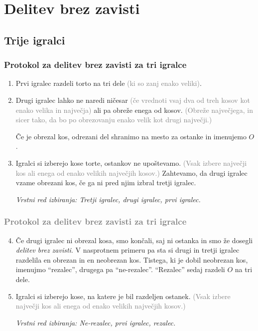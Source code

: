 \documentclass{beamer}
\begin{document}
\section{Delitev brez zavisti}
\subsection{Trije igralci}
\begin{frame}
\frametitle{Protokol za delitev brez zavisti za tri igralce}

\begin{enumerate}

\item Prvi igralec razdeli torto na tri dele \textcolor{gray}{(ki so zanj enako veliki)}.

\item Drugi igralec lahko ne naredi ničesar \textcolor{gray}{(če vrednoti vsaj dva od treh kosov kot enako velika in največja)}
ali pa obreže enega od kosov. \textcolor{gray}{(Obreže največjega, in sicer tako, da bo po obrezovanju enako velik kot drugi največji.)}

Če je obrezal kos, odrezani del shranimo na mesto za ostanke in imenujemo $O$.

\item Igralci si izberejo kose torte, ostankov ne upoštevamo. \textcolor{gray}{(Vsak izbere največji kos ali enega od enako velikih največjih kosov.)} Zahtevamo, da drugi igralec vzame obrezani kos, če ga ni pred njim izbral tretji igralec.

\textsl{Vrstni red izbiranja: Tretji igralec, drugi igralec, prvi igralec.}

\end{enumerate}
\end{frame}
\begin{frame}
\frametitle{\textcolor{gray}{Protokol za delitev brez zavisti za tri igralce}}
\begin{enumerate}
\setcounter{enumi}{3}

\item Če drugi igralec ni obrezal kosa, smo končali, saj ni ostanka in smo že dosegli {\em delitev brez zavisti}. V nasprotnem primeru pa sta si drugi in tretji igralec razdelila en obrezan in en neobrezan kos. Tistega, ki je dobil neobrezan kos, imenujmo ``rezalec'', drugega pa ``ne-rezalec''. ``Rezalec'' sedaj razdeli $O$ na tri dele.

\item Igralci si izberejo kose, na katere je bil razdeljen ostanek. \textcolor{gray}{(Vsak izbere največji kos ali enega od enako velikih največjih kosov.)}

\textsl{Vrstni red izbiranja: Ne-rezalec, prvi igralec, rezalec.}

\end{enumerate}

\end{frame}
\end{document}
